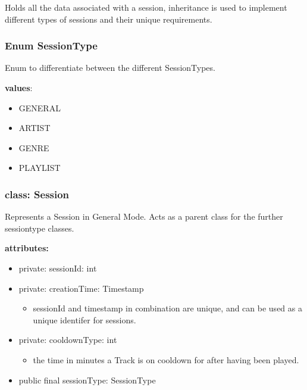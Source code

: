 \documentclass[oneside, ngerman]{sdqtechreport}
\begin{document}
Holds all the data associated with a session, inheritance is used to implement different types of sessions and their unique requirements.
\subsubsection{Enum SessionType}

Enum to differentiate between the different SessionTypes.

\textbf{values}:
\begin{itemize}
    \item GENERAL
    \item ARTIST
    \item GENRE
    \item PLAYLIST
\end{itemize}

\subsubsection{class: Session}
Represents a Session in General Mode. Acts as a parent class for the further sessiontype classes.

\textbf{attributes:}
\begin{itemize}
    \item private: sessionId: int        
    \item private: creationTime: Timestamp
    \begin{itemize}
        \item sessionId and timestamp in combination are unique, and can be used as a unique identifer for sessions.
    \end{itemize}
    \item private: cooldownType: int
    \begin{itemize}
        \item the time in minutes a Track is on cooldown for after having been played.
    \end{itemize}
    \item public final sessionType: SessionType
\end{itemize}
\end{document}
